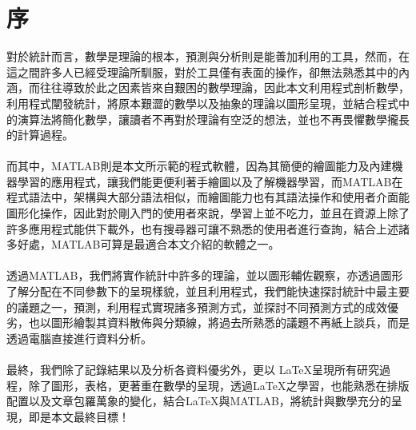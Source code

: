 \chapter*{序}
對於統計而言，數學是理論的根本，預測與分析則是能善加利用的工具，然而，在這之間許多人已經受理論所馴服，對於工具僅有表面的操作，卻無法熟悉其中的內涵，而往往導致於此之因素皆來自艱困的數學理論，因此本文利用程式剖析數學，利用程式闡發統計，將原本艱澀的數學以及抽象的理論以圖形呈現，並結合程式中的演算法將簡化數學，讓讀者不再對於理論有空泛的想法，並也不再畏懼數學攏長的計算過程。
\\
\\
而其中，MATLAB則是本文所示範的程式軟體，因為其簡便的繪圖能力及內建機器學習的應用程式，讓我們能更便利著手繪圖以及了解機器學習，而MATLAB在程式語法中，架構與大部分語法相似，而繪圖能力也有其語法操作和使用者介面能圖形化操作，因此對於剛入門的使用者來說，學習上並不吃力，並且在資源上除了許多應用程式能供下載外，也有搜尋器可讓不熟悉的使用者進行查詢，結合上述諸多好處，MATLAB可算是最適合本文介紹的軟體之一。
\\
\\
透過MATLAB，我們將實作統計中許多的理論，並以圖形輔佐觀察，亦透過圖形了解分配在不同參數下的呈現樣貌，並且利用程式，我們能快速探討統計中最主要的議題之一，預測，利用程式實現諸多預測方式，並探討不同預測方式的成效優劣，也以圖形繪製其資料散佈與分類線，將過去所熟悉的議題不再紙上談兵，而是透過電腦直接進行資料分析。
\\
\\
最終，我們除了記錄結果以及分析各資料優劣外，更以 \LaTeX 呈現所有研究過程，除了圖形，表格，更著重在數學的呈現，透過\LaTeX 之學習，也能熟悉在排版配置以及文章包羅萬象的變化，結合\LaTeX 與MATLAB，將統計與數學充分的呈現，即是本文最終目標！








